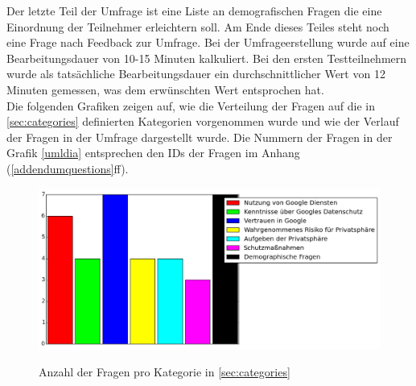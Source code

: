 Der letzte Teil der Umfrage ist eine Liste an demografischen Fragen die eine Einordnung der Teilnehmer erleichtern soll. Am Ende dieses Teiles steht noch eine Frage nach Feedback zur Umfrage.
Bei der Umfrageerstellung wurde auf eine Bearbeitungsdauer von 10-15 Minuten kalkuliert. Bei den ersten Testteilnehmern wurde als tatsächliche Bearbeitungsdauer ein durchschnittlicher Wert von 12 Minuten gemessen, was dem erwünschten Wert entsprochen hat.\\
Die folgenden Grafiken zeigen auf, wie die Verteilung der Fragen auf die in \ref{sec:categories} definierten Kategorien vorgenommen wurde und wie der Verlauf der Fragen in der Umfrage dargestellt wurde. Die Nummern der Fragen in der Grafik \ref{umldia} entsprechen den IDs der Fragen im Anhang (\ref{addendumquestions}ff). 

\begin{figure}[H]
\centering
\includegraphics[width=\textwidth]{images/zahlenkategorien}\\
\caption{Anzahl der Fragen pro Kategorie in \ref{sec:categories}}\label{catnumbers}
\end{figure}


